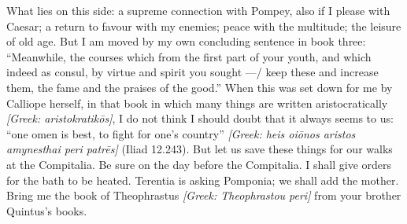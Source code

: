  What lies on this side: a supreme connection with Pompey, also if I please with Caesar; a return to favour with my enemies; peace with the multitude; the leisure of old age. But I am moved by my own concluding sentence in book three: ``Meanwhile, the courses which from the first part of your youth, and which indeed as consul, by virtue and spirit you sought ---/ keep these and increase them, the fame and the praises of the good.'' When this was set down for me by Calliope herself, in that book in which many things are written aristocratically \textit{[Greek: aristokratik\=os]}, I do not think I should doubt that it always seems to us: ``one omen is best, to fight for one's country'' \textit{[Greek: heis oi\=onos aristos amynesthai peri patr\=es]} (Iliad 12.243). But let us save these things for our walks at the Compitalia. Be sure on the day before the Compitalia. I shall give orders for the bath to be heated. Terentia is asking Pomponia; we shall add the mother. Bring me the book of Theophrastus \textit{[Greek: Theophrastou peri]} from your brother Quintus's books.
